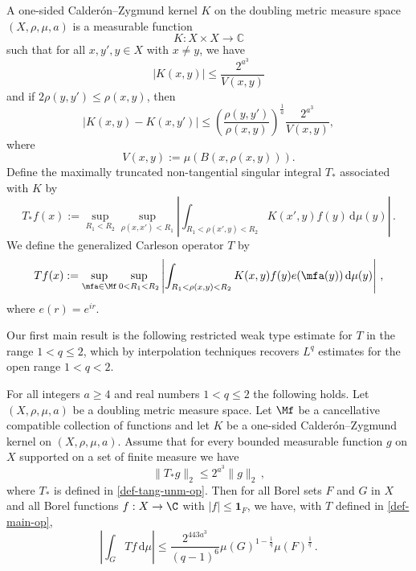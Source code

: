 A one-sided Calder\'on--Zygmund kernel $K$ on the doubling metric measure space $(X, \rho, \mu, a)$ is a measurable function
\begin{equation}\label{eqkernel0}
  K:X\times X\to \mathbb{C}
\end{equation}
such that for all $x,y',y\in X$ with $x\neq y$, we have
\begin{equation}\label{eqkernel-size}
    |K(x,y)| \leq \frac{2^{a^3}}{V(x,y)}
\end{equation}
and if $2\rho(y,y') \leq \rho(x,y)$, then
\begin{equation}
  \label{eqkernel-y-smooth}
  |K(x,y) - K(x,y')| \leq \left(\frac{\rho(y,y')}{\rho(x,y)}\right)^{\frac{1}{a}}\frac{2^{a^3}}{V(x,y)},
\end{equation}
where \[V(x,y):=\mu(B(x,\rho(x,y))).\]
Define the maximally truncated non-tangential singular integral $T_{*}$ associated with $K$ by
\begin{equation}
    \label{def-tang-unm-op}
    T_{*}f(x):=\sup_{R_1 < R_2} \sup_{\rho(x,x')<R_1} \left|\int_{R_1< \rho(x',y) < R_2} K(x',y) f(y) \, \mathrm{d}\mu(y) \right|\,.
\end{equation}
We define the generalized Carleson operator $T$ by
\begin{equation}
    \label{def-main-op}
    Tf(x):=\sup_{\mfa\in\Mf} \sup_{0 < R_1 < R_2}\left| \int_{R_1 < \rho(x,y) < R_2} K(x,y) f(y) e(\mfa(y)) \, \mathrm{d}\mu(y) \right|\, ,
\end{equation}
where $e(r)=e^{ir}$.

Our first main result is the following restricted weak type estimate for $T$ in the range $1<q\le 2$,
which by interpolation techniques recovers $L^q$ estimates for the open range $1<q<2$.
\begin{theorem}
\label{metric-space-Carleson}
\leanok
{}
    For all integers $a \ge 4$ and real numbers $1<q\le 2$ the following holds.
    Let $(X,\rho,\mu,a)$ be a doubling metric measure space.
    Let $\Mf$ be a cancellative compatible collection of functions and let $K$ be a one-sided Calder\'on--Zygmund kernel on $(X,\rho,\mu,a)$.
    Assume that for every bounded measurable function $g$ on $X$ supported on a set of finite measure we have
    \begin{equation}\label{nontanbound}
        \|T_{*}g\|_{2} \leq 2^{a^3} \|g\|_2\,,
    \end{equation}
    where $T_{*}$ is defined in \eqref{def-tang-unm-op}.
    Then for all Borel sets $F$ and $G$ in $X$ and all Borel functions $f:X\to \C$ with
    $|f|\le \mathbf{1}_F$, we have, with $T$ defined in \eqref{def-main-op},
    \begin{equation}
        \label{resweak}
        \left|\int_{G} T f \, \mathrm{d}\mu\right| \leq \frac{2^{443a^3}}{(q-1)^6} \mu(G)^{1-\frac{1}{q}} \mu(F)^{\frac{1}{q}}\, .
    \end{equation}
\end{theorem}


